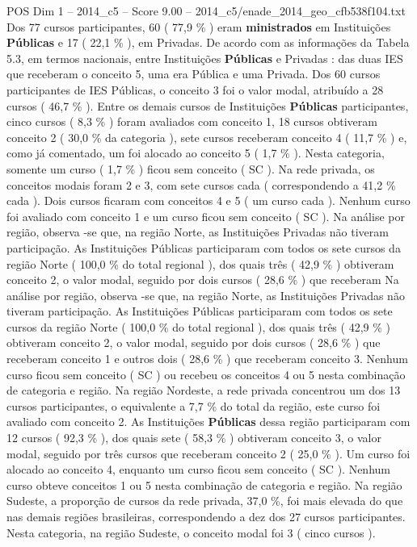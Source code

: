 \begin{textsample}{POS Dim 1 – 2014\_c5 – Score 9.00 – 2014\_c5/enade\_2014\_geo\_cfb538f104.txt}
Dos 77 cursos participantes, 60 ( 77,9 \% ) eram \textbf{ministrados} em Instituições \textbf{Públicas} e 17 ( 22,1 \% ), em Privadas.
De acordo com as informações da Tabela 5.3, em termos nacionais, entre Instituições \textbf{Públicas} e Privadas : das duas IES que receberam o conceito 5, uma era Pública e uma Privada.
Dos 60 cursos participantes de IES Públicas, o conceito 3 foi o valor modal, atribuído a 28 cursos ( 46,7 \% ).
Entre os demais cursos de Instituições \textbf{Públicas} participantes, cinco cursos ( 8,3 \% ) foram avaliados com conceito 1, 18 cursos obtiveram conceito 2 ( 30,0 \% da categoria ), sete cursos receberam conceito 4 ( 11,7 \% ) e, como já comentado, um foi alocado ao conceito 5 ( 1,7 \% ).
Nesta categoria, somente um curso ( 1,7 \% ) ficou sem conceito ( SC ).
Na rede privada, os conceitos modais foram 2 e 3, com sete cursos cada ( correspondendo a 41,2 \% cada ).
Dois cursos ficaram com conceitos 4 e 5 ( um curso cada ).
Nenhum curso foi avaliado com conceito 1 e um curso ficou sem conceito ( SC ).
Na análise por região, observa -se que, na região Norte, as Instituições Privadas não tiveram participação.
As Instituições Públicas participaram com todos os sete cursos da região Norte ( 100,0 \% do total regional ), dos quais três ( 42,9 \% ) obtiveram conceito 2, o valor modal, seguido por dois cursos ( 28,6 \% ) que receberam Na análise por região, observa -se que, na região Norte, as Instituições Privadas não tiveram participação.
As Instituições Públicas participaram com todos os sete cursos da região Norte ( 100,0 \% do total regional ), dos quais três ( 42,9 \% ) obtiveram conceito 2, o valor modal, seguido por dois cursos ( 28,6 \% ) que receberam conceito 1 e outros dois ( 28,6 \% ) que receberam conceito 3.
Nenhum curso ficou sem conceito ( SC ) ou recebeu os conceitos 4 ou 5 nesta combinação de categoria e região.
Na região Nordeste, a rede privada concentrou um dos 13 cursos participantes, o equivalente a 7,7 \% do total da região, este curso foi avaliado com conceito 2.
As Instituições \textbf{Públicas} dessa região participaram com 12 cursos ( 92,3 \% ), dos quais sete ( 58,3 \% ) obtiveram conceito 3, o valor modal, seguido por três cursos que receberam conceito 2 ( 25,0 \% ).
Um curso foi alocado ao conceito 4, enquanto um curso ficou sem conceito ( SC ).
Nenhum curso obteve conceitos 1 ou 5 nesta combinação de categoria e região.
Na região Sudeste, a proporção de cursos da rede privada, 37,0 \%, foi mais elevada do que nas demais regiões brasileiras, correspondendo a dez dos 27 cursos participantes.
Nesta categoria, na região Sudeste, o conceito modal foi 3 ( cinco cursos ).

\end{textsample}
